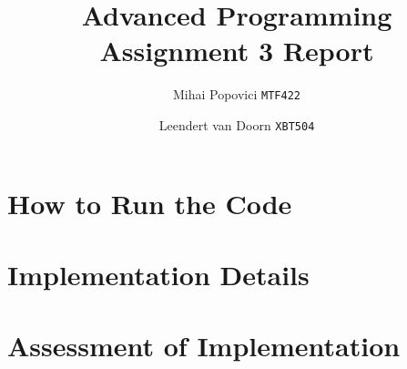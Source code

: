 \documentclass{article}
\title{Advanced Programming Assignment 3 Report}
\author{Mihai Popovici \texttt{MTF422} \and Leendert van Doorn \texttt{XBT504}}
\begin{document}
\maketitle

\section{How to Run the Code}


\section{Implementation Details}


\section{Assessment of Implementation}
\end{document}
